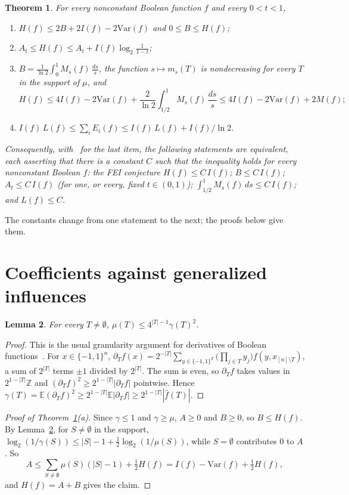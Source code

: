 \documentclass[11pt]{amsart}
\newtheorem{theorem}{Theorem}
\newtheorem{lemma}[theorem]{Lemma}
\theoremstyle{remark}
\newcommand{\Var}{\mathrm{Var}}
\newcommand{\E}{\mathbb{E}}
\begin{document}
\begin{theorem}\label{thm:main}
For every nonconstant Boolean function $f$ and every $0<t<1$,
\begin{enumerate}
\item[(a)] $H(f)\le 2B+2I(f)-2\Var(f)$ and $0\le B\le H(f)$;
\item[(b)] $A_t\le H(f)\le A_t+I(f)\log_2\frac1{1-t}$;
\item[(c)] $B=\frac1{\ln 2}\int_0^1M_s(f)\,\frac{ds}{s}$, the function $s\mapsto m_s(T)$ is nondecreasing for every
$T$ in the support of $\mu$, and
\[
H(f)\le 4I(f)-2\Var(f)+\frac{2}{\ln2}\int_{1/2}^1M_s(f)\,\frac{ds}{s}\le 4I(f)-2\Var(f)+2M(f);
\]
\item[(d)] $I(f)\,L(f)\le\sum_iE_i(f)\le I(f)\,L(f)+I(f)/\ln 2$.
\end{enumerate}
Consequently, with~\cite[Corollary~5]{Shm1} for the last item, the following statements are equivalent, each
asserting that there is a constant $C$ such that the inequality holds for every nonconstant Boolean $f$: the FEI
conjecture $H(f)\le C\,I(f)$; $B\le C\,I(f)$; $A_t\le C\,I(f)$ (for one, or every, fixed $t\in(0,1)$);
$\int_{1/2}^1M_s(f)\,ds\le C\,I(f)$; and $L(f)\le C$.
\end{theorem}

The constants change from one statement to the next; the proofs below give them.

\section{Coefficients against generalized influences}\label{sec:split}

\begin{lemma}\label{lem:gran}
For every $T\ne\emptyset$, $\mu(T)\le 4^{|T|-1}\gamma(T)^2$.
\end{lemma}

\begin{proof}
This is the usual granularity argument for derivatives of Boolean functions~\cite[Chapter~2]{OD14}. For
$x\in\{-1,1\}^n$, $\partial_Tf(x)=2^{-|T|}\sum_{y\in\{-1,1\}^T}\bigl(\prod_{j\in T}y_j\bigr)f(y,x_{[n]\setminus T})$, a sum of
$2^{|T|}$ terms $\pm1$ divided by $2^{|T|}$. The sum is even, so $\partial_Tf$ takes values in $2^{1-|T|}\mathbb Z$ and
$(\partial_Tf)^2\ge 2^{1-|T|}|\partial_Tf|$ pointwise. Hence
$\gamma(T)=\E(\partial_Tf)^2\ge 2^{1-|T|}\E|\partial_Tf|\ge 2^{1-|T|}|\hat f(T)|$.
\end{proof}

\begin{proof}[Proof of Theorem~\ref{thm:main}(a)]
Since $\gamma\le1$ and $\gamma\ge\mu$, $A\ge0$ and $B\ge0$, so $B\le H(f)$. By Lemma~\ref{lem:gran}, for $S\ne\emptyset$
in the support, $\log_2(1/\gamma(S))\le |S|-1+\tfrac12\log_2(1/\mu(S))$, while $S=\emptyset$ contributes $0$ to $A$. So
\[
A\le\sum_{S\ne\emptyset}\mu(S)(|S|-1)+\tfrac12H(f)=I(f)-\Var(f)+\tfrac12H(f),
\]
and $H(f)=A+B$ gives the claim.
\end{proof}
\end{document}
